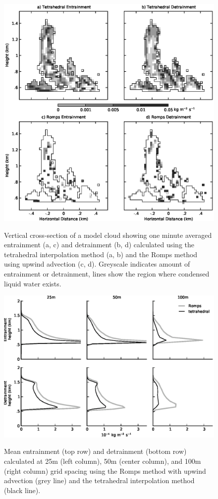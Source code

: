 \documentclass[12pt]{article}
\begin{document}
\begin{figure}[t]
  \noindent\includegraphics[width=39pc,angle=0]{./figures/spatial_variability_1min}\\ 
  \caption{Vertical cross-section of a model cloud showing one minute averaged 
  entrainment (a, c) and detrainment (b, d) calculated using the tetrahedral 
  interpolation method (a, b) and the Romps method using upwind advection (c, 
  d).  Greyscale indicates amount of entrainment or detrainment, lines show the 
  region where condensed liquid water exists.
  }
  \label{fig:spatial_variability}
\end{figure}

\begin{figure}[t]
  \noindent
  \includegraphics[width=39pc,angle=0]{./figures/resolution_dependence}\\
  \caption{Mean entrainment (top row) and detrainment (bottom row) calculated
  at 25m (left column), 50m (center column), and 100m (right column) grid 
  spacing using the Romps method with upwind advection (grey line) and the 
  tetrahedral interpolation method (black line).
  }
  \label{fig:resolution_dependence}
\end{figure}
\end{document}
